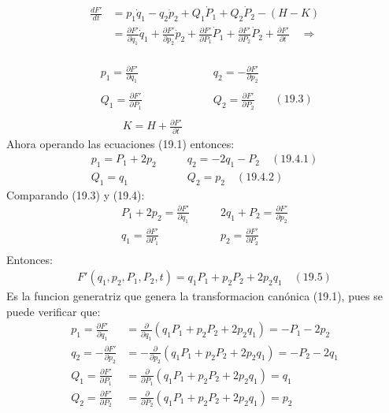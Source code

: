 \documentclass[a4paper]{article}
\begin{document}
\begin{answer}[Punto 19]
        \begin{align*}
            \frac {dF'}{dt} &= p_1\dot q_1 - q_2 \dot p_2 + Q_1\dot P_1 + Q_2 \dot P_2 - (H-K)\\
            &= \frac{\partial F'}{\partial q_1} \dot q_1 + \frac{\partial F'}{\partial p_2} \dot p_2 + \frac{\partial F'}{\partial P_1}\dot P_1+\frac{\partial F'}{\partial P_2} \dot P_2 + \frac{\partial F'}{\partial t} \quad \Rightarrow\\
        \end{align*}

        \begin{equation*}
            \begin{align*}
                p_1 = \frac{\partial F'}{\partial q_1} & \qquad q_2 = -\frac{\partial F'}{\partial p_2} \\\\
                Q_1 = \frac{\partial F'}{\partial P_1} & \qquad Q_2= \frac{\partial F'}{\partial P_2} \\\\
                \qquad K = H+\frac{\partial F'}{\partial t} 
            \end{align*} \quad (19.3)
        \end{equation*}
        Ahora operando las ecuaciones (19.1)  entonces:
        \begin{align*}
            p_1 = P_1 + 2p_2 &\qquad q_2 = -2q_1 - P_2 \quad (19.4.1)\\
            Q_1 = q_1 &\qquad Q_2 = p_2 \quad (19.4.2)
        \end{align*}
        Comparando (19.3) y (19.4):
        \begin{align*}
                P_1 + 2p_2 = \frac{\partial F'}{\partial q_1} &\qquad  2q_1 + P_2 = \frac{\partial F'}{\partial p_2} \\
                q_1 = \frac{\partial F'}{\partial P_1} &\qquad  p_2= \frac{\partial F'}{\partial P_2} \\
        \end{align*}
        Entonces:
        \begin{align*}
            F'(q_1, p_2, P_1, P_2, t) = q_1 P_1 + p_2 P_2 + 2p_2 q_1 \quad (19.5)
        \end{align*}
        Es la funcion generatriz que genera la transformacion canónica (19.1), pues se puede verificar que:
        \begin{align*}
            p_1 = \frac{\partial F'}{\partial q_1} &= \frac{\partial}{\partial q_1} \left(q_1 P_1 + p_2 P_2 + 2p_2 q_1\right) = -P_1 - 2p_2\\
            q_2 = -\frac{\partial F'}{\partial p_2} &= -\frac{\partial}{\partial p_2} \left(q_1 P_1 + p_2 P_2 + 2p_2 q_1\right) =- P_2 - 2q_1\\
            Q_1 = \frac{\partial F'}{\partial P_1} &= \frac{\partial}{\partial P_1} \left(q_1 P_1 + p_2 P_2 + 2p_2 q_1\right) = q_1\\  
            Q_2 = \frac{\partial F'}{\partial P_2} &= \frac{\partial}{\partial P_2} \left(q_1 P_1 + p_2 P_2 + 2p_2 q_1\right) = p_2\\
        \end{align*}

    \end{answer}
\end{document}
